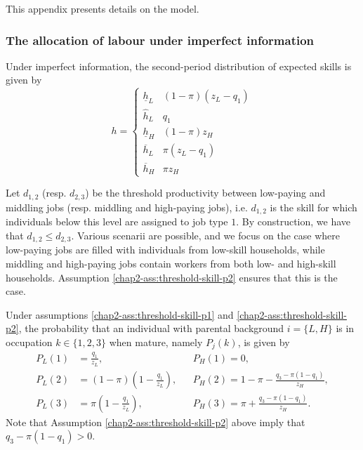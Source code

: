 This appendix presents details on the model.

\subsubsection{The allocation of labour under imperfect information}

Under imperfect information, the second-period distribution of expected skills is given by
\begin{equation*}
    h=\left\{ 
    \begin{array}{cc}
    \underline{h}_{L} & (1-\pi )(z_{L}-q_1) \\ 
    \widehat{h}_L & q_{1} \\ 
    \underline{h}_{H} & (1-\pi )z_{H} \\ 
    \overline{h}_{L} & \pi (z_{L}-q_1) \\ 
    \overline{h}_{H} & \pi z_{H}%
    \end{array}%
    \right.  
\end{equation*}

Let $d_{1,2}$ (resp. $d_{2,3}$) be the threshold productivity between low-paying and middling jobs (resp. middling and high-paying jobs), i.e. $d_{1,2}$ is the skill for which individuals below this level are assigned to job type $1$. By construction, we have that $d_{1,2} \leq d_{2,3}$. Various scenarii are possible, and we focus on the case where low-paying jobs are filled with individuals from low-skill households, while middling and high-paying jobs contain workers from both low- and high-skill households. Assumption \ref{chap2-ass:threshold-skill-p2} ensures that this is the case. 

Under assumptions \ref{chap2-ass:threshold-skill-p1} and \ref{chap2-ass:threshold-skill-p2}, the
probability that an individual with parental background $i=\{L,H\}$ is in occupation $k\in\{1,2,3\}$ when mature, namely $P_j(k)$, is given by
\begin{align*}
    P_L(1) &=\frac{q_1}{z_L}, &&P_H(1) = 0,\\
    P_L(2) &=(1-\pi)\left(1-\frac{q_1}{z_L}\right), &&P_H(2) = 1- \pi - \frac{q_{3}-\pi (1-q_{1})}{z_{H}},\\
    P_L(3) &=\pi \left(1-\frac{q_1}{z_L}\right), &&P_H(3) = \pi +\frac{q_{3}-\pi (1-q_{1})}{z_{H}}.
\end{align*}
Note that Assumption \ref{chap2-ass:threshold-skill-p2} above imply that $q_{3}-\pi (1-q_{1})>0$. 


